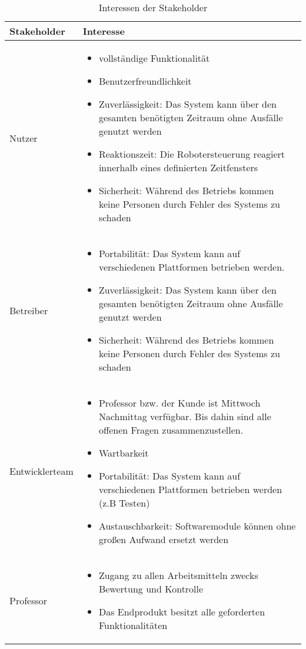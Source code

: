 \begin{table}[h!]
	\caption{Interessen der Stakeholder}
	\label{tab:stakeholder}
	\centering
	\begin{tabular}{|p{2.5cm}|p{10cm}|}
		\hline
		\textbf{Stakeholder} & \textbf{Interesse}  \\
		\hline
		Nutzer   
		& \parbox{10cm}{\begin{itemize}
			\item vollständige Funktionalität
			\item Benutzerfreundlichkeit
			\item Zuverlässigkeit: Das System kann über den gesamten benötigten Zeitraum ohne Ausfälle genutzt werden
			\item Reaktionszeit: Die Robotersteuerung reagiert innerhalb eines definierten Zeitfensters
			\item Sicherheit: Während des Betriebs kommen keine Personen durch Fehler des Systems zu schaden
		\end{itemize}}
		\\
		\hline
		Betreiber 
		&\parbox{10cm}{\begin{itemize}
			\item Portabilität: Das System kann auf verschiedenen Plattformen betrieben werden.
			\item Zuverlässigkeit: Das System kann über den gesamten benötigten Zeitraum ohne Ausfälle genutzt werden
			\item Sicherheit: Während des Betriebs kommen keine Personen durch Fehler des Systems zu schaden
		\end{itemize}}
		\\
		\hline
		Entwicklerteam 
		&\parbox{10cm}{ \begin{itemize}
			\item Professor bzw. der \glqq Kunde\grqq{} ist Mittwoch Nachmittag verfügbar. Bis dahin sind alle offenen Fragen zusammenzustellen.
			\item Wartbarkeit
			\item Portabilität: Das System kann auf verschiedenen Plattformen betrieben werden (z.B Testen)
			\item Austauschbarkeit: Softwaremodule können ohne großen Aufwand ersetzt werden
		\end{itemize}}
		\\
		\hline
		Professor & \parbox{10cm}{\begin{itemize}
			\item Zugang zu allen Arbeitsmitteln zwecks Bewertung und Kontrolle
			\item Das Endprodukt besitzt alle geforderten Funktionalitäten
		\end{itemize}}
		\\
		\hline
	\end{tabular}
\end{table}



